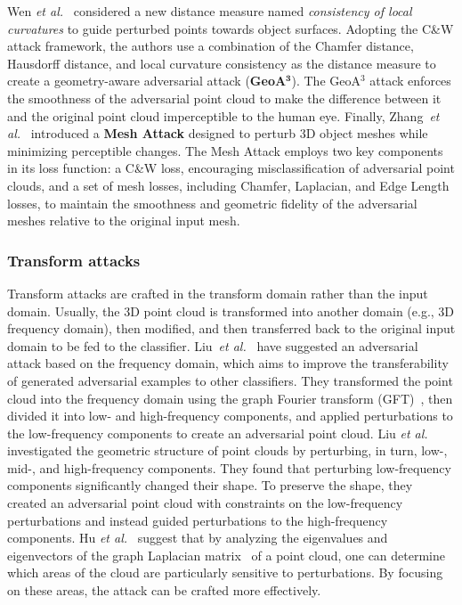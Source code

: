 \documentclass{ieeeaccess}
\def\etal{\textit{et al.}}
\begin{document}
Wen \etal~\cite{wen2020geometry} considered a new distance measure named \textit{consistency of local curvatures} to guide perturbed points towards object surfaces. Adopting the C\&W attack framework, the authors use a combination of the Chamfer distance, Hausdorff distance, and local curvature consistency as the distance measure to create a geometry-aware adversarial attack (\textbf{GeoA$^\mathbf{3}$}). The  GeoA$^3$ attack enforces the smoothness of the adversarial point cloud to make the difference between it and the original point cloud imperceptible to the human eye.
Finally, Zhang~\etal~\cite{zhang20233d} introduced a \textbf{Mesh Attack} designed to perturb 3D object meshes while minimizing perceptible changes. The Mesh Attack employs two key components in its loss function: a C\&W loss, encouraging misclassification of adversarial point clouds, and a set of mesh losses, including Chamfer, Laplacian, and Edge Length losses, to maintain the smoothness and geometric fidelity of the adversarial meshes relative to the original input mesh.


\subsubsection{Transform attacks}
\label{subsubsec:Transform attacks}

Transform attacks are crafted in the transform domain rather than the input domain. Usually, the 3D point cloud is transformed into another domain (e.g., 3D frequency domain), then modified, and then transferred back to the original input domain to be fed to the classifier. Liu~\etal~\cite{liu2022boosting} have suggested an adversarial attack based on the frequency domain, which aims to improve the transferability of generated adversarial examples to other classifiers.  They transformed the point cloud into the frequency domain using the graph Fourier transform (GFT)~\cite{GSP2013SPM}, then divided it into low- and high-frequency components, and applied perturbations to the low-frequency components to create an adversarial point cloud. 
Liu \etal~\cite{liu2022point} investigated the geometric structure of point clouds by perturbing, in turn, low-, mid-, and high-frequency components. They found that perturbing low-frequency components significantly changed their shape. To preserve the shape, they created an adversarial point cloud with constraints on the low-frequency perturbations and instead guided perturbations to the high-frequency components. Hu \etal~\cite{hu2022exploring} suggest that by analyzing the eigenvalues and eigenvectors of the graph Laplacian matrix~\cite{GSP2013SPM} of a point cloud, one can determine which areas of the cloud are particularly sensitive to perturbations. By focusing on these areas, the attack can be crafted more effectively.
\end{document}

